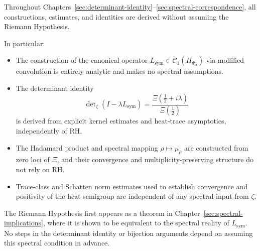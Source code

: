 \begin{remark}
\label{rem:no-rh-assumption}
Throughout Chapters~\ref{sec:determinant-identity}–\ref{sec:spectral-correspondence}, all constructions, estimates, and identities are derived without assuming the Riemann Hypothesis.

In particular:
\begin{itemize}
  \item The construction of the canonical operator \( L_{\mathrm{sym}} \in \mathcal{C}_1(H_{\Psi_\alpha}) \) via mollified convolution is entirely analytic and makes no spectral assumptions.
  \item The determinant identity
  \[
  \det\nolimits_{\zeta}(I - \lambda L_{\mathrm{sym}})
  = \frac{\Xi\left( \tfrac{1}{2} + i\lambda \right)}{\Xi\left( \tfrac{1}{2} \right)}
  \]
  is derived from explicit kernel estimates and heat-trace asymptotics, independently of RH.
  \item The Hadamard product and spectral mapping \( \rho \mapsto \mu_\rho \) are constructed from zero loci of \( \Xi \), and their convergence and multiplicity-preserving structure do not rely on RH.
  \item Trace-class and Schatten norm estimates used to establish convergence and positivity of the heat semigroup are independent of any spectral input from \( \zeta \).
\end{itemize}

The Riemann Hypothesis first appears as a theorem in Chapter~\ref{sec:spectral-implications}, where it is shown to be equivalent to the spectral reality of \( L_{\mathrm{sym}} \). No steps in the determinant identity or bijection arguments depend on assuming this spectral condition in advance.

\end{remark}
% 